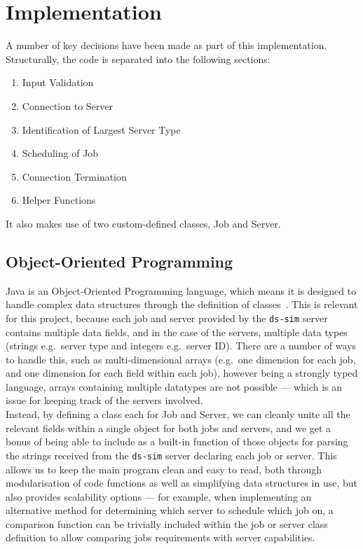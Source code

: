 \documentclass[a4paper]{article} %
\begin{document}
\section{Implementation} %
A number of key decisions have been made as part of this implementation. Structurally, the code is separated into the following sections:
\begin{enumerate}
    \item Input Validation
    \item Connection to Server
    \item Identification of Largest Server Type
    \item Scheduling of Job
    \item Connection Termination
    \item Helper Functions
\end{enumerate}
It also makes use of two custom-defined classes, Job and Server. 
\subsection{Object-Oriented Programming}
Java is an Object-Oriented Programming language, which means it is designed to handle complex data structures through the definition of classes\ \cite{javadoc}. This is relevant for this project, because each job and server 
provided by the \texttt{ds-sim} server contains multiple data fields, and in the case of the servers, multiple data types (strings e.g.\ server type and integers e.g.\ server ID). There are a number of ways to handle this, 
such as multi-dimensional arrays (e.g.\ one dimension for each job, and one dimension for each field within each job), however being a strongly typed language, arrays containing multiple datatypes are not possible --- which 
is an issue for keeping track of the servers involved.\\
Instead, by defining a class each for Job and Server, we can cleanly unite all the relevant fields within a single object for both jobs and servers, and we get a bonus of being able to include as a built-in function of 
those objects for parsing the strings received from the \texttt{ds-sim} server declaring each job or server. This allows us to keep the main program clean and easy to read, both through modularisation of code functions 
as well as simplifying data structures in use, but also provides scalability options --- for example, when implementing an alternative method for determining which server to schedule which job on, a comparison function can 
be trivially included within the job or server class definition to allow comparing jobs requirements with server capabilities.
\end{document}

